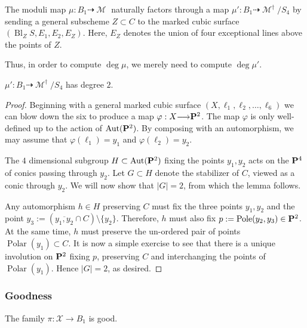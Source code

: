 \documentclass[12pt,reqno]{amsart}
\DeclareMathOperator{\Bl}{Bl}
\DeclareMathOperator{\Polar}{Polar}
\DeclareMathOperator{\Pole}{Pole}
\DeclareMathOperator{\M}{\mathcal{M}}
\renewcommand{\to}{{\longrightarrow}}
\numberwithin{equation}{section}
\newcommand{\cX}{\mathcal{X}}
\begin{document}
The moduli map $\mu: B_{1} \dashrightarrow \M$ naturally factors
through a map $\mu': B_1 \dashrightarrow \M^{\dagger}/S_{4}$ by
sending a general subscheme $Z \subset C$ to the marked cubic surface
$(\Bl_{Z}S, E_1, E_2, E_{Z})$. Here, $E_Z$ denotes the union of four
exceptional lines above the points of $Z$.


Thus, in order to compute $\deg \mu$, we merely need to compute
$\deg \mu'$.

  \begin{lemma}
    \label{lemma:degreemudaggerB1}
    $\mu': B_1 \dashrightarrow \M^{\dagger}/S_{4}$ has degree $2$.
  \end{lemma}

  \begin{proof}
    Beginning with a general marked cubic surface
    $(X, \ell_{1}, \ell_2, \dots, \ell_{6})$ we can blow down the six
    to produce a map $\varphi: X \to \P^2$. The map $\varphi$ is only
    well-defined up to the action of $\Aut(\P^{2})$.  By composing
    with an automorphism, we may assume that
    $\varphi(\ell_{1}) = y_{1}$ and $\varphi(\ell_{2}) = y_{2}$.

    The $4$ dimensional subgroup $H \subset \Aut(\P^{2})$ fixing the
    points $y_{1}, y_{2}$ acts on the $\P^{4}$ of conics passing
    through $y_{2}$. Let $G \subset H$ denote the stabilizer of $C$,
    viewed as a conic through $y_{2}$.  We will now show that $|G|=2$,
    from which the lemma follows.

    Any automorphism $h \in H$ preserving $C$ must fix the three
    points $y_{1},y_{2}$ and the point
    $y_{3}:= (\overline{y_{1},y_{2}} \cap C) \setminus \{y_{2}\}.$
    Therefore, $h$ must also fix $p := \Pole(y_{2},y_{3}) \in \P^{2}$.
    At the same time, $h$ must preserve the un-ordered pair of points
    $\Polar(y_{1}) \subset C$. It is now a simple exercise to see that
    there is a unique involution on $\P^{2}$ fixing $p$, preserving
    $C$ and interchanging the points of $\Polar(y_{1})$. Hence
    $|G|=2$, as desired.
  \end{proof}




\subsubsection{Goodness}
\label{sec:goodness1}

\begin{proposition}
  \label{prop:B1good}
  The family $\pi: \cX \to B_1$ is good.
\end{proposition}
\end{document}
